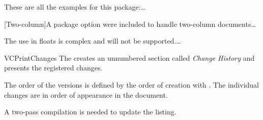 \documentclass[a4paper, 11pt]{article}
\begin{document}
\begin{tcblisting}{}
    These are all the examples for this package:\ldots
\end{tcblisting}

\begin{tcblisting}{}
    [Two-column]A package option were included to handle two-column documents\ldots
\end{tcblisting}

\begin{tcblisting}{}
    The use in floats is complex and will not be supported.\ldots
\end{tcblisting}

\begin{macro}{VCPrintChanges}
    The  creates an unnumbered section called \textit{Change History} and presents the registered changes.

    The order of the versions is defined by the order of creation with . The individual changes are in order of appearance in the document.

    A two-pass compilation is needed to update the listing.
\end{macro}

\begin{tcblisting}{}
    \VCPrintChanges
\end{tcblisting}

\begin{tcblisting}{}
    \begingroup
    \VCPrintChanges
    \endgroup
\end{tcblisting}

\printindex
\end{document}
